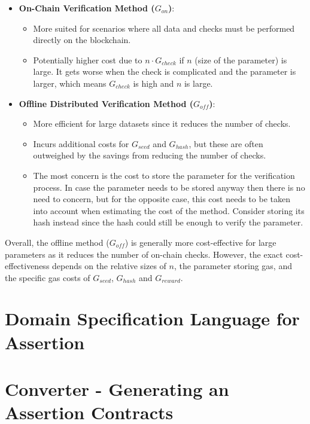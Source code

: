\documentclass[runningheads]{llncs}
\begin{document}
\begin{itemize}
    \item \textbf{On-Chain Verification Method (\( G_{on} \))}:
    \begin{itemize}
        \item More suited for scenarios where all data and checks must be performed directly on the blockchain.
        \item Potentially higher cost due to \( n \cdot G_{check} \) if \( n \) (size of the parameter) is large. It gets worse when the check is complicated and the parameter is larger, which means \( G_{check} \) is high and \( n \) is large.
    \end{itemize}
    
    \item \textbf{Offline Distributed Verification Method (\( G_{off} \))}:
    \begin{itemize}
        \item More efficient for large datasets since it reduces the number of checks. %
        \item Incurs additional costs for \( G_{seed} \) and \( G_{hash} \), but these are often outweighed by the savings from reducing the number of checks.
        \item The most concern is the cost to store the parameter for the verification process. In case the parameter needs to be stored anyway then there is no need to concern, but for the opposite case, this cost needs to be taken into account when estimating the cost of the method. Consider storing its hash instead since the hash could still be enough to verify the parameter. %
    \end{itemize}
\end{itemize}

Overall, the offline method (\( G_{off} \)) is generally more cost-effective for large parameters as it reduces the number of on-chain checks. However, the exact cost-effectiveness depends on the relative sizes of \( n \), the parameter storing gas, and the specific gas costs of \( G_{seed} \), \( G_{hash} \) and \( G_{reward} \).
\section{Domain Specification Language for Assertion}
\section{Converter - Generating an Assertion Contracts} 
\end{document}
